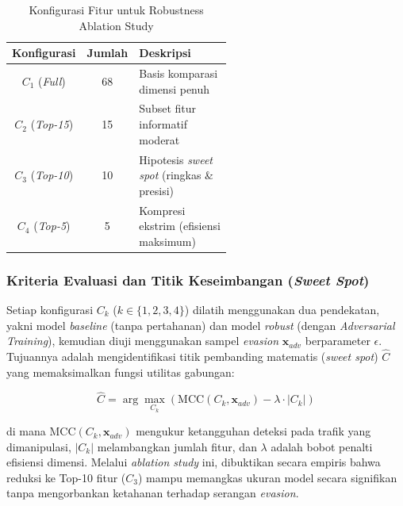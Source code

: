 \documentclass[11pt, a4paper]{article}
\begin{document}

\begin{table}[htbp]
\caption{Konfigurasi Fitur untuk Robustness Ablation Study}
\label{tab:ablation_configurations}
\centering
\vspace{0.2cm}
\small
\begin{tabular}{@{}c c p{0.55\linewidth}@{}}
\toprule
\textbf{Konfigurasi} & \textbf{Jumlah} & \textbf{Deskripsi} \\ \midrule
$C_1$ (\textit{Full}) & 68 & Basis komparasi dimensi penuh \\ \addlinespace
$C_2$ (\textit{Top-15}) & 15 & Subset fitur informatif moderat \\ \addlinespace
$C_3$ (\textit{Top-10}) & 10 & Hipotesis \textit{sweet spot} (ringkas \& presisi) \\ \addlinespace
$C_4$ (\textit{Top-5}) & 5 & Kompresi ekstrim (efisiensi maksimum) \\ \bottomrule
\end{tabular}
\end{table}


\subsubsection{Kriteria Evaluasi dan Titik Keseimbangan (\textit{Sweet Spot})}
Setiap konfigurasi $C_k$ ($k \in \{1, 2, 3, 4\}$) dilatih menggunakan dua pendekatan, yakni model \textit{baseline} (tanpa pertahanan) dan model \textit{robust} (dengan \textit{Adversarial Training}), kemudian diuji menggunakan sampel \textit{evasion} $\mathbf{x}_{adv}$ berparameter $\epsilon$. Tujuannya adalah mengidentifikasi titik pembanding matematis (\textit{sweet spot}) $\hat{C}$ yang memaksimalkan fungsi utilitas gabungan:

\begin{equation}
\hat{C} = \arg\max_{C_k} \left( \text{MCC}(C_k, \mathbf{x}_{adv}) - \lambda \cdot |C_k| \right)
\end{equation}

di mana $\text{MCC}(C_k, \mathbf{x}_{adv})$ mengukur ketangguhan deteksi pada trafik yang dimanipulasi, $|C_k|$ melambangkan jumlah fitur, dan $\lambda$ adalah bobot penalti efisiensi dimensi. Melalui \textit{ablation study} ini, dibuktikan secara empiris bahwa reduksi ke Top-10 fitur ($C_3$) mampu memangkas ukuran model secara signifikan tanpa mengorbankan ketahanan terhadap serangan \textit{evasion}.
\end{document}

